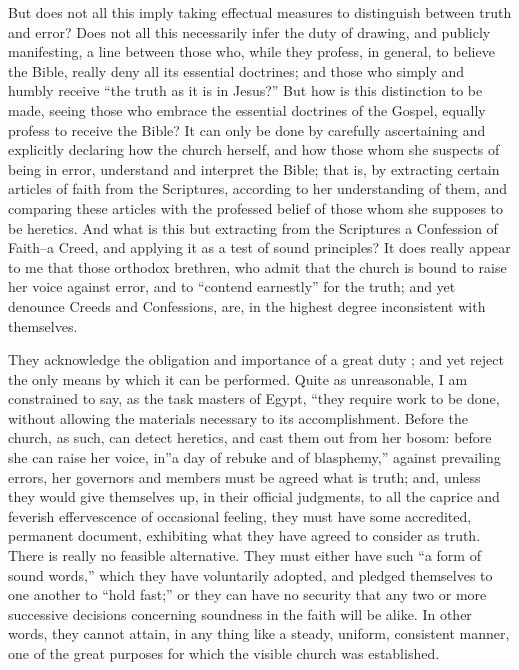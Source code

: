 \documentclass[
]{book}
\begin{document}
But does not all this imply taking effectual measures to distinguish between truth and error? Does not all this necessarily infer the duty of drawing, and publicly manifesting, a line between those who, while they profess, in general, to believe the Bible, really deny all its essential doctrines; and those who simply and humbly receive ``the truth as it is in Jesus?'' But how is this distinction to be made, seeing those who embrace the essential doctrines of the Gospel, equally profess to receive the Bible? It can only be done by carefully ascertaining and explicitly declaring how the church herself, and how those whom she suspects of being in error, understand and interpret the Bible; that is, by extracting certain articles of faith from the Scriptures, according to her understanding of them, and comparing these articles with the professed belief of those whom she supposes to be heretics. And what is this but extracting from the Scriptures a Confession of Faith--a Creed, and applying it as a test of sound principles? It does really appear to me that those orthodox brethren, who admit that the church is bound to raise her voice against error, and to ``contend earnestly'' for the truth; and yet denounce Creeds and Confessions, are, in the highest degree inconsistent with themselves.

They acknowledge the obligation and importance of a great duty ; and yet reject the only means by which it can be performed. Quite as unreasonable, I am constrained to say, as the task masters of Egypt, ``they require work to be done, without allowing the materials necessary to its accomplishment. Before the church, as such, can detect heretics, and cast them out from her bosom: before she can raise her voice, in''a day of rebuke and of blasphemy,'' against prevailing errors, her governors and members must be agreed what is truth; and, unless they would give themselves up, in their official judgments, to all the caprice and feverish effervescence of occasional feeling, they must have some accredited, permanent document, exhibiting what they have agreed to consider as truth. There is really no feasible alternative. They must either have such ``a form of sound words,'' which they have voluntarily adopted, and pledged themselves to one another to ``hold fast;'' or they can have no security that any two or more successive decisions concerning soundness in the faith will be alike. In other words, they cannot attain, in any thing like a steady, uniform, consistent manner, one of the great purposes for which the visible church was established.
\end{document}
